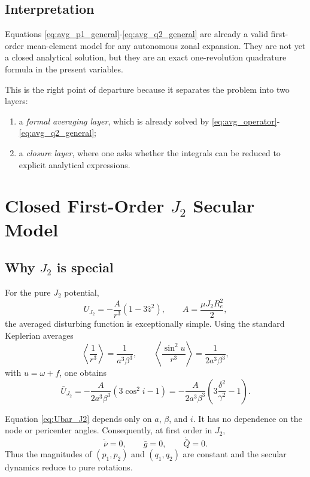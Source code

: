 \documentclass[11pt]{article}
\begin{document}
\subsection{Interpretation}

Equations \eqref{eq:avg_p1_general}-\eqref{eq:avg_q2_general} are already a
valid first-order mean-element model for any autonomous zonal expansion.
They are not yet a closed analytical solution, but they are an exact
one-revolution quadrature formula in the present variables.

This is the right point of departure because it separates the
problem into two layers:
\begin{enumerate}
    \item a \emph{formal averaging layer}, which is already solved by
    \eqref{eq:avg_operator}-\eqref{eq:avg_q2_general};
    \item a \emph{closure layer}, where one asks whether the integrals can be
    reduced to explicit analytical expressions.
\end{enumerate}

\section{Closed First-Order \texorpdfstring{$J_2$}{J2} Secular Model}
\label{sec:j2}

\subsection{Why \texorpdfstring{$J_2$}{J2} is special}

For the pure $J_2$ potential,
\begin{equation}
U_{J_2} = -\frac{A}{r^3}\left(1-3\hat z^2\right),
\qquad
A = \frac{\mu J_2 R_e^2}{2},
\end{equation}
the averaged disturbing function is exceptionally simple. Using the standard
Keplerian averages
\begin{equation}
\left\langle \frac{1}{r^3}\right\rangle
= \frac{1}{a^3\beta^3},
\qquad
\left\langle \frac{\sin^2 u}{r^3}\right\rangle
= \frac{1}{2a^3\beta^3},
\end{equation}
with $u=\omega+f$, one obtains
\begin{equation}
\bar U_{J_2}
= -\frac{A}{2a^3\beta^3}\left(3\cos^2 i - 1\right)
= -\frac{A}{2a^3\beta^3}
\left(3\frac{\delta^2}{\gamma^2} - 1\right).
\label{eq:Ubar_J2}
\end{equation}

Equation \eqref{eq:Ubar_J2} depends only on $a$, $\beta$, and $i$. It has no
dependence on the node or pericenter angles. Consequently, at first order in
$J_2$,
\begin{equation}
\dot{\bar\nu} = 0,
\qquad
\dot{\bar g} = 0,
\qquad
\dot{\bar Q} = 0.
\end{equation}
Thus the magnitudes of $(p_1,p_2)$ and $(q_1,q_2)$ are constant and the secular
dynamics reduce to pure rotations.
\end{document}
